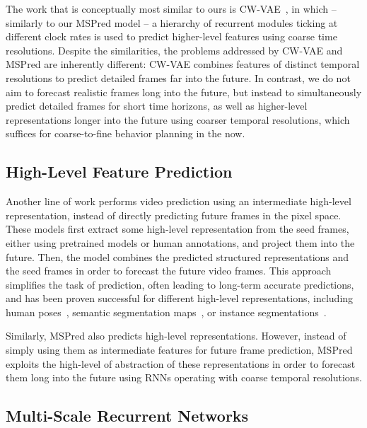 \documentclass{bmvc2k}
\begin{document}
The work that is conceptually most similar to ours is CW-VAE~\cite{Saxena_ClockworkVariationalAutoencoders_2021}, in which -- similarly to our MSPred model -- a hierarchy of recurrent modules ticking at different clock rates is used to predict higher-level features using coarse time resolutions.
Despite the similarities, the problems addressed by CW-VAE and MSPred are inherently different:
CW-VAE combines features of distinct temporal resolutions to predict detailed frames far into the future.
In contrast, we do not aim to forecast realistic frames long into the future, but instead to simultaneously predict detailed frames for short time horizons, as well as higher-level representations longer into the future using coarser temporal resolutions, which suffices for coarse-to-fine behavior planning in the now.



\subsection{High-Level Feature Prediction}

Another line of work performs video prediction using an intermediate high-level representation, instead of directly predicting future frames in the pixel space.
These models first extract some high-level representation from the seed frames, either using pretrained models or human annotations, and project them into the future. Then, the model combines the predicted structured representations and the seed frames in order to forecast the future video frames.
This approach simplifies the task of prediction, often leading to long-term accurate predictions, and has been proven successful for different high-level representations, including human poses~\cite{Villegas_LearningToGenerateLongTermFutureViaHierarchicalPredcition_2017,Fushishita_LongTermVideoGenerationOfMultipleHumanPoses_2020}, semantic segmentation maps~\cite{Pan_VideoGenerationFromSingleSemanticLabp_2019}, or instance segmentations~\cite{Luc_PredictingFutureInstanceSegmentation_2018predicting}.


Similarly, MSPred also predicts high-level representations. However, instead of simply using them as intermediate features for future frame prediction, MSPred exploits the high-level of abstraction of these representations in order to forecast them long into the future using RNNs operating with coarse temporal resolutions.


\vspace{-0.3cm}
\subsection{Multi-Scale Recurrent Networks}
\end{document}
